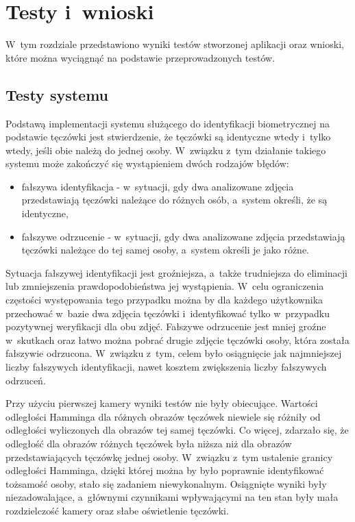 \chapter{Testy i~wnioski}
\label{cha:testywnioski}
W~tym rozdziale przedstawiono wyniki testów stworzonej aplikacji oraz wnioski, które można wyciągnąć na podstawie przeprowadzonych testów.

\section{Testy systemu}
\label{sec:testy}
Podstawą implementacji systemu służącego do identyfikacji biometrycznej na podstawie tęczówki jest stwierdzenie, że tęczówki są identyczne wtedy i~tylko wtedy, jeśli obie należą do jednej osoby. W~związku z~tym działanie takiego systemu może zakończyć się wystąpieniem dwóch rodzajów błędów:
\begin{itemize}
\item fałszywa identyfikacja - w~sytuacji, gdy dwa analizowane zdjęcia przedstawiają tęczówki należące do różnych osób, a~system określi, że są identyczne,
\item fałszywe odrzucenie - w~sytuacji, gdy dwa analizowane zdjęcia przedstawiają tęczówki należące do tej samej osoby, a~system określi je jako różne.
\end{itemize}
Sytuacja fałszywej identyfikacji jest groźniejsza, a~także trudniejsza do eliminacji lub zmniejszenia prawdopodobieństwa jej wystąpienia. W~celu ograniczenia częstości występowania tego przypadku można by dla każdego użytkownika przechować w~bazie dwa zdjęcia tęczówki i~identyfikować tylko w~przypadku pozytywnej weryfikacji dla obu zdjęć. Fałszywe odrzucenie jest mniej groźne w~skutkach oraz łatwo można pobrać drugie zdjęcie tęczówki osoby, która została fałszywie odrzucona. W~związku z~tym, celem było osiągnięcie jak najmniejszej liczby fałszywych identyfikacji, nawet kosztem zwiększenia liczby fałszywych odrzuceń.

Przy użyciu pierwszej kamery wyniki testów nie były obiecujące. Wartości odległości Hamminga dla różnych obrazów tęczówek niewiele się różniły od odległości wyliczonych dla obrazów tej samej tęczówki. Co więcej, zdarzało się, że odległość dla obrazów różnych tęczówek była niższa niż dla obrazów przedstawiających tęczówkę jednej osoby. W~związku z~tym ustalenie granicy odległości Hamminga, dzięki której można by było poprawnie identyfikować tożsamość osoby, stało się zadaniem niewykonalnym. Osiągnięte wyniki były niezadowalające, a~głównymi czynnikami wpływającymi na ten stan były mała rozdzielczość kamery oraz słabe oświetlenie tęczówki.

